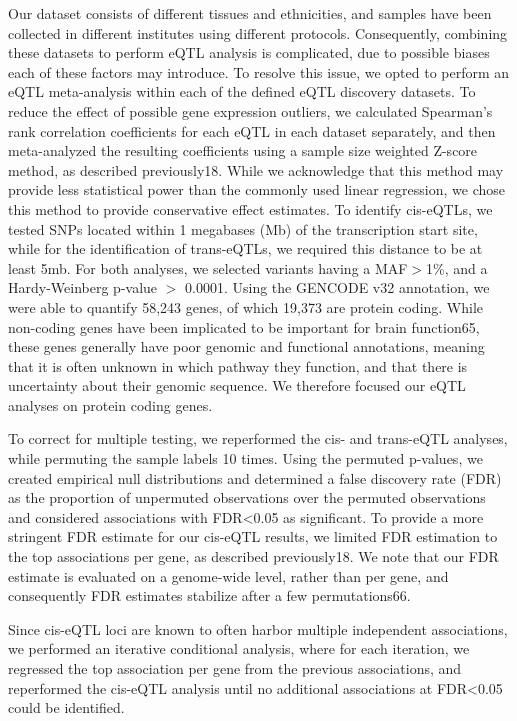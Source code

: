 Our dataset consists of different tissues and ethnicities, and samples have been collected in different institutes using different protocols. Consequently, combining these datasets to perform eQTL analysis is complicated, due to possible biases each of these factors may introduce. To resolve this issue, we opted to perform an eQTL meta-analysis within each of the defined eQTL discovery datasets. To reduce the effect of possible gene expression outliers, we calculated Spearman’s rank correlation coefficients for each eQTL in each dataset separately, and then meta-analyzed the resulting coefficients using a sample size weighted Z-score method, as described previously18. While we acknowledge that this method may provide less statistical power than the commonly used linear regression, we chose this method to provide conservative effect estimates. To identify cis-eQTLs, we tested SNPs located within 1 megabases (Mb) of the transcription start site, while for the identification of trans-eQTLs, we required this distance to be at least 5mb. For both analyses, we selected variants having a MAF$>$1\%, and a Hardy-Weinberg p-value $>$ 0.0001. Using the GENCODE v32 annotation, we were able to quantify 58,243 genes, of which 19,373 are protein coding. While non-coding genes have been implicated to be important for brain function65, these genes generally have poor genomic and functional annotations, meaning that it is often unknown in which pathway they function, and that there is uncertainty about their genomic sequence. We therefore focused our eQTL analyses on protein coding genes. 

To correct for multiple testing, we reperformed the cis- and trans-eQTL analyses, while permuting the sample labels 10 times. Using the permuted p-values, we created empirical null distributions and determined a false discovery rate (FDR) as the proportion of unpermuted observations over the permuted observations and considered associations with FDR<0.05 as significant. To provide a more stringent FDR estimate for our cis-eQTL results, we limited FDR estimation to the top associations per gene, as described previously18. We note that our FDR estimate is evaluated on a genome-wide level, rather than per gene, and consequently FDR estimates stabilize after a few permutations66. 

Since cis-eQTL loci are known to often harbor multiple independent associations, we performed an iterative conditional analysis, where for each iteration, we regressed the top association per gene from the previous associations, and reperformed the cis-eQTL analysis until no additional associations at FDR<0.05 could be identified. 

